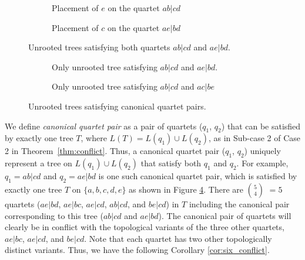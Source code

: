 \documentclass[runningheads]{llncs}
\newcommand{\addb}[1]{{\color{red} #1}}
\begin{document}
\begin{figure}[h]
    \centering
    \begin{subfigure}{0.45\textwidth}
        \centering
        \caption{Placement of $e$ on the quartet $ab|cd$}
        \label{fig:place_e_on_ab|cd}
    \end{subfigure}
    \hfill 
    \begin{subfigure}{0.45\textwidth}
        \centering
        \caption{Placement of $c$ on the quartet $ae|bd$}
        \label{fig:place_c_on_ae|bd}
    \end{subfigure}
    \caption{Unrooted trees satisfying both quartets $ab|cd$ and $ae|bd$.}
    \label{fig:comparison_e_and_c}
\end{figure}

\begin{figure}[h]
    \centering
    \begin{subfigure}{0.35\textwidth}
        \centering
        \caption{Only unrooted tree satisfying $ab|cd$ and $ae|bd$.}
        \label{fig:unrooted_tree_1}
    \end{subfigure}
    \hfill 
    \centering
    \begin{subfigure}{0.35\textwidth}
        \centering
        \caption{Only unrooted tree satisfying $ab|cd$ and $ac|be$}
        \label{fig:unrooted_tree_2}
    \end{subfigure}
    \caption{Unrooted trees satisfying canonical quartet pairs.}
 
\end{figure}






We define \textit{canonical quartet pair} as a pair of quartets ($q_1$, $q_2$) that can be satisfied by exactly one tree $T$, where $L(T) = L(q_1) \cup L(q_2)$, as in Sub-case 2 of Case 2 in Theorem~\ref{thm:conflict}. Thus, a canonical quartet pair ($q_1$, $q_2$) uniquely represent a tree on $L(q_1) \cup L(q_2)$ that satisfy both $q_1$ and $q_2$. For example, $q_1 = ab|cd$ and $q_2 = ae|bd$ %
is one such canonical quartet pair, which is satisfied by exactly one tree $T$ on $\{a,b,c,d,e\}$ as shown in Figure \ref{fig:unrooted_tree_1}. There are $5 \choose 4$ $=5$ quartets ($ae|bd$, $ae|bc$, $ae|cd$, $ab|cd$, and $be|cd$) in $T$ including the canonical pair corresponding to this tree ($ab|cd$ and $ae|bd$). The canonical pair of quartets will clearly be in conflict with the topological variants of the three other quartets, $ae|bc$, $ae|cd$, and $be|cd$. Note that each quartet has two other topologically distinct variants. Thus, we have the following Corollary \ref{cor:six_conflict}.
\end{document}
